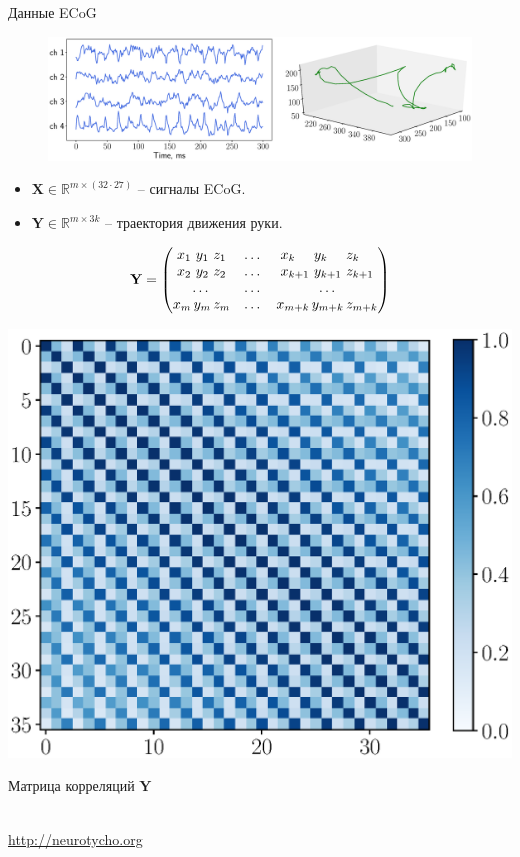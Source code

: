 \documentclass[9pt]{beamer}
\newcommand{\bX}{\mathbf{X}}
\newcommand{\bY}{\mathbf{Y}}
\newcommand{\bbR}{\mathbb{R}}
\begin{document}
\begin{frame}{Данные ECoG}
\begin{figure}
	\includegraphics[width=\linewidth]{figs/ecog_data}
\end{figure}
\begin{minipage}{.55\linewidth}
\begin{itemize}
	\item $\bX \in \bbR^{m \times (32 \cdot 27)}$ -- сигналы ECoG.
	\item $\bY \in \bbR^{m \times 3k}$ -- траектория движения руки.
\end{itemize}
\vspace{0.1cm}
\[
	\bY = 
	\begin{pmatrix}
	x_1 \,\, y_1 \,\, z_1 & \dots & x_{k\hphantom{+1}} \,\, y_{k\hphantom{+1}} \,\, z_{k\hphantom{+1}}\\
	x_2 \,\, y_2 \,\, z_2 & \dots & x_{k + 1} \,\, y_{k + 1} \,\, z_{k + 1}\\
	 \dots & \dots & \dots  \\
	x_m \, y_m \, z_m & \dots & x_{m + k} \, y_{m + k} \, z_{m + k}
	\end{pmatrix}
\]
\end{minipage}%
\begin{minipage}{.43\linewidth}
	\includegraphics[width=\linewidth]{figs/Y_corr_matrix.eps}
	\begin{center}
		\vspace{-0.4cm}
		Матрица корреляций $\bY$
		\vspace{-0.4cm}
	\end{center}
\end{minipage}
\vspace{0.5cm}

\hrulefill \\
\url{http://neurotycho.org}
\end{frame}
\end{document}
